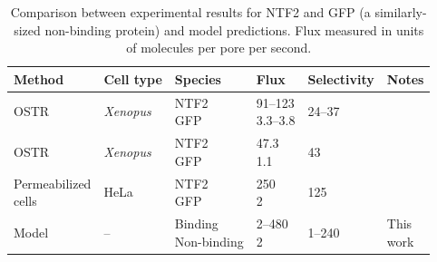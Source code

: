 

\begin{table}[b!]
  \caption{Comparison between experimental results for NTF2 and GFP
    (a similarly-sized non-binding protein) and model
    predictions. Flux measured in units of molecules per pore per
    second.}
    \label{table:NTF2-flux}
    \begin{tabular}{p{2.1cm}p{1.2cm}p{1.7cm}p{0.9cm}p{1.6cm}p{0.8cm}}
      Method & Cell type & Species & Flux & Selectivity & Notes\\
      \hline
      OSTR & \textit{Xenopus} & \makecell[cl]{NTF2\\GFP} & \makecell[cl]{91--123\\3.3--3.8} & 24--37 
                         &\cite{siebrasse02}
      \\
      OSTR & \textit{Xenopus} & \makecell[cl]{NTF2\\GFP} & \makecell[cl]{47.3\\1.1} & 43 &  \cite{kiskin03}\\
      \makecell[cl]{Permeabilized \\ cells}  & HeLa &
                                                    \makecell[cl]{NTF2\\GFP} & \makecell[cl]{250\\2} & 125 & \cite{ribbeck01}\\
      Model & -- & \makecell[cl]{Binding\\Non-binding} & \makecell[cl]{2--480\\2} & 1--240 & \makecell[cl]{This\\work}\\
    \end{tabular}
\end{table}

